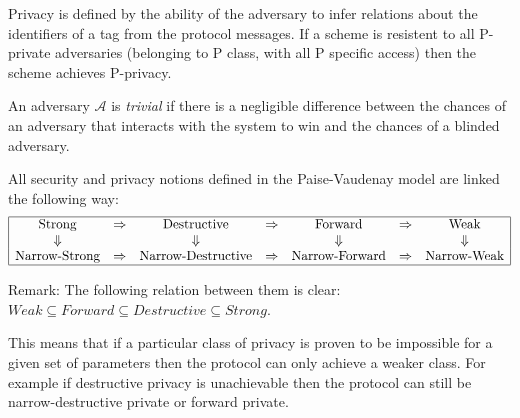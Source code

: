     Privacy is defined by the ability of the adversary to infer relations about the identifiers of a tag from the protocol
    messages. If a scheme is resistent to all P-private adversaries (belonging to P class, with all
    P specific access) then the scheme achieves P-privacy.

    An adversary $\mathcal{A}$ is \textit{trivial} if there is a negligible difference between the chances
    of an adversary that interacts with the system to win and the chances of a blinded adversary.

    All security and privacy notions defined in the Paise-Vaudenay model are linked the following way:
    \[
    \begin{array}{|ccccccc|}
        \hline
        \text{Strong} & \Rightarrow & \text{Destructive} & \Rightarrow & \text{Forward} & \Rightarrow & \text{Weak} \\
        \Downarrow & &  \Downarrow  & &\Downarrow  & & \Downarrow \\
        \text{Narrow-Strong} & \Rightarrow & \text{Narrow-Destructive} & \Rightarrow & \text{Narrow-Forward} & \Rightarrow & \text{Narrow-Weak} \\
        \hline
    \end{array}
    \]

    Remark: The following relation between them is clear: $Weak \subseteq Forward \subseteq Destructive \subseteq Strong$.

    This means that if a particular class of privacy is proven to be impossible for a given set of parameters then the protocol can only 
    achieve a weaker class. For example if destructive privacy is unachievable then the protocol can still be narrow-destructive private or 
    forward private.
